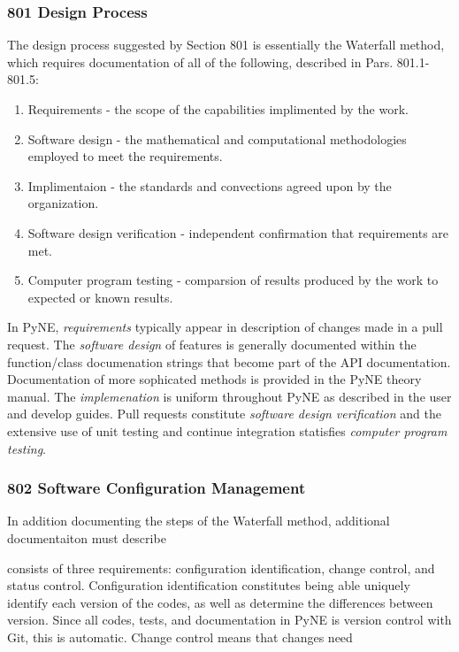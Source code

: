 \documentclass{anstrans}
\begin{document}
\subsubsection{801 Design Process}

The design process suggested by Section 801 is essentially the Waterfall method, which requires documentation of all of the following, described in Pars. 801.1-801.5:

\begin{enumerate} 
\item{Requirements - the scope of the capabilities implimented by the work.}
\item{Software design - the mathematical and computational methodologies employed to meet the requirements.}
\item{Implimentaion - the standards and convections agreed upon by the organization.}
\item{Software design verification - independent confirmation that requirements are met.}
\item{Computer program testing - comparsion of results produced by the work to expected or known results.}
\end{enumerate}

In PyNE, \emph{requirements} typically appear in description of changes made in
a pull request. The \emph{software design} of features is generally documented
within the function/class documenation strings that become part of the API
documentation. Documentation of more sophicated methods is provided in the PyNE
theory manual. The \emph{implemenation} is uniform throughout PyNE as described
in the user and develop guides. Pull requests constitute \emph{software design
verification} and the extensive use of unit testing and continue integration
statisfies \emph{computer program testing}.


\subsubsection{802 Software Configuration Management}

In addition documenting the steps of the Waterfall method, additional documentaiton must describe 


consists of three requirements: configuration identification, change control, and status control. Configuration identification constitutes being able uniquely identify each version of the codes, as well as determine the differences between version. Since all codes, tests, and documentation in PyNE is version control with Git, this is automatic. Change control means that changes need 
\end{document}
